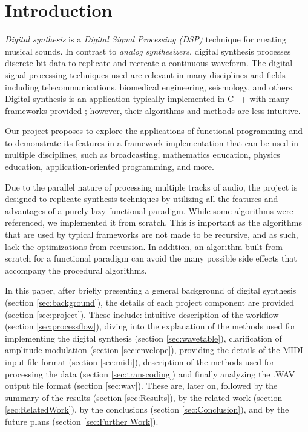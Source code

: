 \documentclass[runningheads]{llncs}
\begin{document}
\section{Introduction}

\emph{Digital synthesis} is a \textit{Digital Signal Processing (DSP)}
technique for creating musical sounds. In contrast to \emph{analog synthesizers}\label{gloss:AnalogSythesizers}, digital synthesis processes discrete bit data to replicate and recreate a continuous waveform. 
The digital signal processing techniques used are relevant in many disciplines and fields 
including telecommunications, biomedical engineering, seismology, and others.
Digital synthesis is an application typically implemented in C++ with many frameworks provided \cite{maxiSynth,szanto}; however, their algorithms and methods are less intuitive.

Our project proposes to explore the applications of functional programming and to demonstrate 
its features in a framework implementation that can be used in multiple 
disciplines, such as broadcasting, mathematics education, physics education, application-oriented programming, and more.


Due to the parallel nature of processing multiple tracks of audio, the project is designed to replicate synthesis techniques by utilizing all the features and advantages of a purely lazy functional paradigm. While some algorithms were referenced, we implemented it from scratch. This is important as the algorithms that are used by typical frameworks are not made to be recursive, and as such, lack the optimizations from recursion. In addition, an algorithm built from scratch for a functional paradigm can avoid the many possible side effects that accompany the procedural algorithms.


In this paper, after briefly presenting a general background of digital synthesis (section 
\ref{sec:background}), the details of each project component are provided (section 
\ref{sec:project}). These include: intuitive description of the workflow (section \ref{sec:processflow}), diving into the explanation of the methods used for implementing the digital synthesis (section \ref{sec:wavetable}), clarification of amplitude modulation (section \ref{sec:envelope}), providing the details of the MIDI input file format (section \ref{sec:midi}), description of the methods used for processing the data (section \ref{sec:transcoding}) and finally analyzing the .WAV output file format (section \ref{sec:wav}).
These are, later on, followed by the summary of the results (section 
\ref{sec:Results}), by the related work (section 
\ref{sec:RelatedWork}), by the conclusions (section \ref{sec:Conclusion}), and by the
future plans (section \ref{sec:Further Work}).
\end{document}
